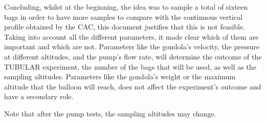 Concluding, whilst at the beginning, the idea was to sample a total of sixteen bags in order to have more samples to compare with the continuous vertical profile obtained by the CAC, this document justifies that this is not feasible. Taking into account all the different parameters, it made clear which of them are important and which are not. Parameters like the gondola's velocity, the pressure at different altitudes, and the pump's flow rate, will determine the outcome of the TUBULAR experiment, the number of the bags that will be used, as well as the sampling altitudes. Parameters like the gondola's weight or the maximum altitude that the balloon will reach, does not affect the experiment's outcome and have a secondary role.


Note that after the pump tests, the sampling altitudes may change.   







\newpage